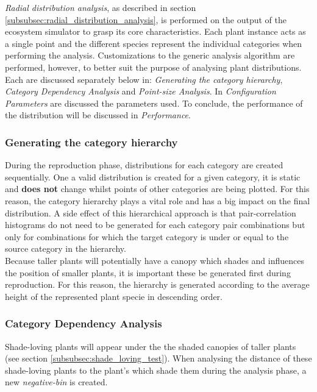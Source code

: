 \textit{Radial distribution analysis}, as described in section \ref{subsubsec:radial_distribution_analysis}, is performed on the output of the ecosystem simulator to grasp its core characteristics. Each plant instance acts as a single point and the different species represent the individual categories when performing the analysis. Customizations to the generic analysis algorithm are performed, however, to better suit the purpose of analysing plant distributions. Each are discussed separately below in: \textit{Generating the category hierarchy}, \textit{Category Dependency Analysis} and \textit{Point-size Analysis}. In \textit{Configuration Parameters} are discussed the parameters used. To conclude, the performance of the distribution will be discussed in \textit{Performance}.

\subsubsection{Generating the category hierarchy} \label{subsubsec:generating_cat_hierarchy}

During the reproduction phase, distributions for each category are created sequentially. One a valid distribution is created for a given category, it is static and \textbf{does not} change whilst points of other categories are being plotted. For this reason, the category hierarchy plays a vital role and has a big impact on the final distribution. A side effect of this hierarchical approach is that pair-correlation histograms do not need to be generated for each category pair combinations but only for combinations for which the target category is under or equal to the source category in the hierarchy.\\

Because taller plants will potentially have a canopy which shades and influences the position of smaller plants, it is important these be generated first during reproduction. For this reason, the hierarchy is generated according to the average height of the represented plant specie in descending order.

\subsubsection{Category Dependency Analysis}

Shade-loving plants will appear under the the shaded canopies of taller plants (see section \ref{subsubsec:shade_loving_test}). When analysing the distance of these shade-loving plants to the plant's which shade them during the analysis phase, a new \textit{negative-bin} is created.\\

